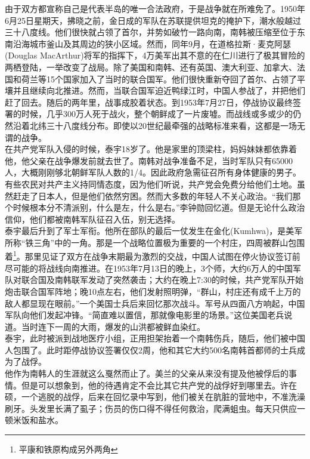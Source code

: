 \begin{multicols}{\theparacolNo}
由于双方都宣称自己是代表半岛的唯一合法政府，于是战争就在所难免了。1950年6月25日星期天，拂晓之前，金日成的军队在苏联提供坦克的掩护下，潮水般越过三十八度线。他们很快就占领了首尔，并势如破竹一路向南，南韩被压缩至位于东南沿海城市釜山及其周边的狭小区域。然而，同年9月，在道格拉斯·麦克阿瑟(Douglas MacArthur)将军的指挥下，4万美军出其不意的在仁川进行了极其冒险的两栖登陆，一举改变了战局。除了美国和南韩、还有英国、澳大利亚、加拿大、法国和荷兰等15个国家加入了当时的联合国军。他们很快重新夺回了首尔、占领了平壤并且继续向北推进。然而，当联合国军迫近鸭绿江时，中国人参战了，并把他们赶了回去。随后的两年里，战事成胶着状态。到1953年7月27日，停战协议最终签署的时候，几乎300万人死于战火，整个朝鲜成了一片废墟。而战线或多或少的仍然沿着北纬三十八度线分布。即使以20世纪最牵强的战略标准来看，这都是一场无谓的战争。\\

在共产党军队入侵的时候，泰宇18岁了。他是家里的顶梁柱，妈妈妹妹都依靠着他，他父亲在战争爆发前就去世了。南韩对战争准备不足，当时军队只有65000人，大概刚刚够北朝鲜军队人数的1/4。因此政府急需征召所有身体健康的男子。有些农民对共产主义持同情态度，因为他们听说，共产党会免费分给他们土地。虽然赶走了日本人，但是他们依然穷困。然而大多数的年轻人不关心政治。“我们那个时候根本分不清派别，什么是左，什么是右。”李钟勋回忆道。但是无论什么政治信仰，他们都被南韩军队征召入伍，别无选择。\\

泰宇最后升到了军士军衔。他所在部队的最后一仗发生在金化(Kumhwa)，是美军所称“铁三角”中的一角。那是一个战略位置极为重要的一个村庄，四周被群山包围着\footnote{平康和铁原构成另外两角}。那里见证了双方在战争末期最为激烈的交战，中国人试图在停火协议签订前尽可能的将战线向南推进。在1953年7月13日的晚上，3个师，大约6万人的中国军队对联合国及南韩联军发动了突然袭击；大约在晚上7:30的时候，共产党军队开始炮击联合国军阵地；晚10点左右，他们发射照明弹，“群山，村庄还有成千上万的敌人都显现在眼前。”一个美国士兵后来回忆那次战斗。军号从四面八方响起，中国军队向他们发起冲锋。“简直难以置信，那就像电影里的场景。”这位美国老兵说道。当时连下一周的大雨，爆发的山洪都被鲜血染红。\\

泰宇，此时被派到战地医疗小组，正用担架抬着一个南韩伤兵，随后，他们被中国人包围了。此时距停战协议签署仅仅2周，他和其它大约500名南韩首都师的士兵成为了战俘。\\

他作为南韩人的生涯就这么戛然而止了。美兰的父亲从来没有提及他被俘后的事情。但是可以想象到，他的待遇肯定不会比其它共产党的战俘好到哪里去。许在硕，一个逃脱的战俘，后来在回忆录中写到，他们被关在肮脏的营地中，不准洗澡刷牙。头发里长满了虱子；伤员的伤口得不得任何救治，爬满蛆虫。每天只供应一顿米饭和盐水。\\


\end{multicols}
